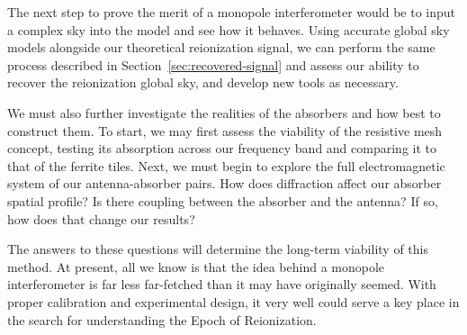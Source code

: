 The next step to prove the merit of a monopole interferometer would be to input 
a complex sky into the model and see how it behaves. Using accurate global sky 
models alongside our theoretical reionization signal, we can perform the same 
process described in Section~\ref{sec:recovered-signal} and assess our ability 
to recover the reionization global sky, and develop new tools as necessary.

We must also further investigate the realities of the absorbers and how best to 
construct them. To start, we may first assess the viability of the resistive 
mesh concept, testing its absorption across our frequency band and comparing it 
to that of the ferrite tiles. Next, we must begin to explore the full 
electromagnetic system of our antenna-absorber pairs. How does diffraction 
affect our absorber spatial profile? Is there coupling between the absorber and 
the antenna? If so, how does that change our results?

The answers to these questions will determine the long-term viability of this 
method. At present, all we know is that the idea behind a monopole 
interferometer is far less far-fetched than it may have originally seemed. With 
proper calibration and experimental design, it very well could serve a key 
place in the search for understanding the Epoch of Reionization.
